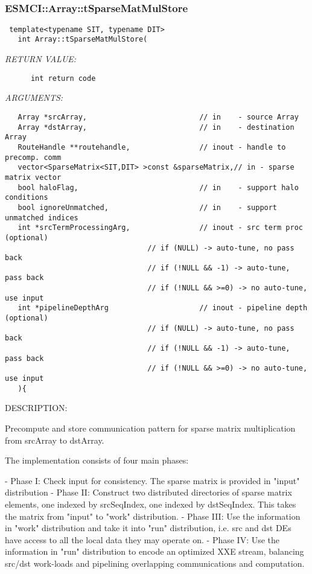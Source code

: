  
\mbox{}\hrulefill\
 
\subsubsection [ESMCI::Array::tSparseMatMulStore] {ESMCI::Array::tSparseMatMulStore}


  
\begin{verbatim} template<typename SIT, typename DIT>
   int Array::tSparseMatMulStore(\end{verbatim}{\em RETURN VALUE:}
\begin{verbatim}      int return code\end{verbatim}{\em ARGUMENTS:}
\begin{verbatim}   Array *srcArray,                          // in    - source Array
   Array *dstArray,                          // in    - destination Array
   RouteHandle **routehandle,                // inout - handle to precomp. comm
   vector<SparseMatrix<SIT,DIT> >const &sparseMatrix,// in - sparse matrix vector
   bool haloFlag,                            // in    - support halo conditions
   bool ignoreUnmatched,                     // in    - support unmatched indices
   int *srcTermProcessingArg,                // inout - src term proc (optional)
                                 // if (NULL) -> auto-tune, no pass back
                                 // if (!NULL && -1) -> auto-tune, pass back
                                 // if (!NULL && >=0) -> no auto-tune, use input
   int *pipelineDepthArg                     // inout - pipeline depth (optional)
                                 // if (NULL) -> auto-tune, no pass back
                                 // if (!NULL && -1) -> auto-tune, pass back
                                 // if (!NULL && >=0) -> no auto-tune, use input
   ){\end{verbatim}
{\sf DESCRIPTION:\\ }


    Precompute and store communication pattern for sparse matrix multiplication
    from srcArray to dstArray.
  
    The implementation consists of four main phases:
  
    - Phase I:    Check input for consistency. The sparse matrix is provided in
                  "input" distribution
    - Phase II:   Construct two distributed directories of sparse matrix
                  elements, one indexed by srcSeqIndex, one indexed by
                  dstSeqIndex. This takes the matrix from "input" to "work"
                  distribution.
    - Phase III:  Use the information in "work" distribution and take it into
                  "run" distribution, i.e. src and dst DEs have access to all
                  the local data they may operate on.
    - Phase IV:   Use the information in "run" distribution to encode an
                  optimized XXE stream, balancing src/dst work-loads and
                  pipelining overlapping communications and computation.
   
